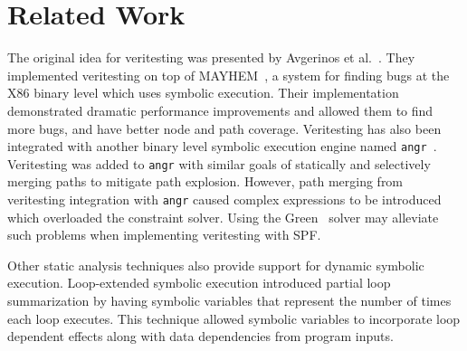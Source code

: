 \section{Related Work}
%
The original idea for veritesting was presented by Avgerinos et al.~\cite{veritesting}.
%
They implemented veritesting on top of MAYHEM~\cite{mayhem}, a system for finding bugs at the X86 binary level which uses symbolic execution.
%
Their implementation demonstrated dramatic performance improvements and allowed them to find more bugs, and have better node and path coverage.
%
Veritesting has also been integrated with another binary level symbolic execution engine named {\tt angr}~\cite{angr}.
%
Veritesting was added to {\tt angr} with similar goals of statically and selectively merging paths to mitigate path explosion.
%
However, path merging from veritesting integration with {\tt angr} caused complex expressions to be introduced which overloaded the constraint solver.
%
Using the Green~\cite{green} solver may alleviate such problems when implementing veritesting with SPF.
%
%

Other static analysis techniques also provide support for dynamic symbolic execution.
%
Loop-extended symbolic execution introduced partial loop summarization by having symbolic variables that represent the number of times each loop executes.
%
This technique allowed symbolic variables to incorporate loop dependent effects along with data dependencies from program inputs.
%

